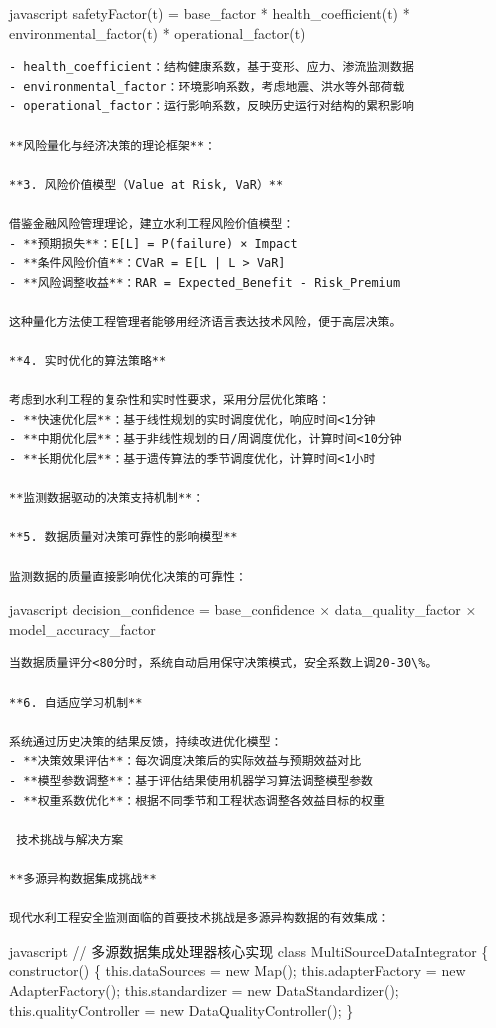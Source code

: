 javascript safetyFactor(t) = base\_factor * health\_coefficient(t) * environmental\_factor(t) * operational\_factor(t)

\begin{lstlisting}
- health_coefficient：结构健康系数，基于变形、应力、渗流监测数据
- environmental_factor：环境影响系数，考虑地震、洪水等外部荷载
- operational_factor：运行影响系数，反映历史运行对结构的累积影响

**风险量化与经济决策的理论框架**：

**3. 风险价值模型（Value at Risk, VaR）**

借鉴金融风险管理理论，建立水利工程风险价值模型：
- **预期损失**：E[L] = P(failure) × Impact
- **条件风险价值**：CVaR = E[L | L > VaR]
- **风险调整收益**：RAR = Expected_Benefit - Risk_Premium

这种量化方法使工程管理者能够用经济语言表达技术风险，便于高层决策。

**4. 实时优化的算法策略**

考虑到水利工程的复杂性和实时性要求，采用分层优化策略：
- **快速优化层**：基于线性规划的实时调度优化，响应时间<1分钟
- **中期优化层**：基于非线性规划的日/周调度优化，计算时间<10分钟
- **长期优化层**：基于遗传算法的季节调度优化，计算时间<1小时

**监测数据驱动的决策支持机制**：

**5. 数据质量对决策可靠性的影响模型**

监测数据的质量直接影响优化决策的可靠性：
\end{lstlisting}

javascript decision\_confidence = base\_confidence × data\_quality\_factor × model\_accuracy\_factor

\begin{lstlisting}
当数据质量评分<80分时，系统自动启用保守决策模式，安全系数上调20-30\%。

**6. 自适应学习机制**

系统通过历史决策的结果反馈，持续改进优化模型：
- **决策效果评估**：每次调度决策后的实际效益与预期效益对比
- **模型参数调整**：基于评估结果使用机器学习算法调整模型参数
- **权重系数优化**：根据不同季节和工程状态调整各效益目标的权重

 技术挑战与解决方案

**多源异构数据集成挑战**

现代水利工程安全监测面临的首要技术挑战是多源异构数据的有效集成：
\end{lstlisting}

javascript // 多源数据集成处理器核心实现 class MultiSourceDataIntegrator \{ constructor() \{ this.dataSources = new Map(); this.adapterFactory = new AdapterFactory(); this.standardizer = new DataStandardizer(); this.qualityController = new DataQualityController(); \}

